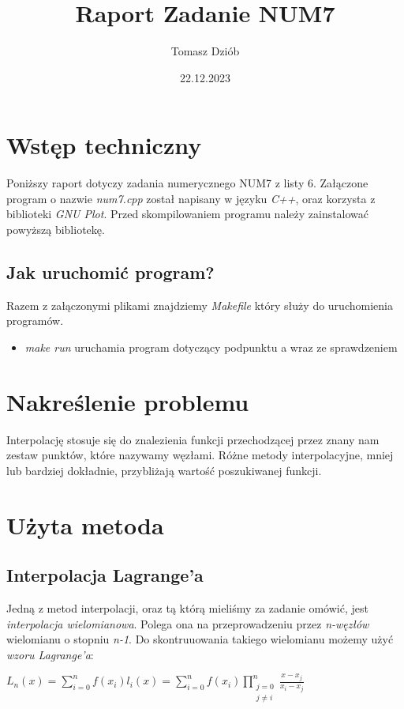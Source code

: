 \documentclass{article}
\title{Raport Zadanie NUM7}
\date{22.12.2023}
\author{Tomasz Dziób}
\begin{document}
  \maketitle
  \newpage
  \section{Wstęp techniczny}
  Poniższy raport dotyczy zadania numerycznego NUM7 z listy 6. Załączone program o nazwie \textit{num7.cpp} został napisany w języku \textit{C++}, oraz korzysta z biblioteki \textit{GNU Plot}. Przed skompilowaniem programu należy zainstalować powyższą bibliotekę.

    \subsection{Jak uruchomić program?}
    Razem z załączonymi plikami znajdziemy \textit{Makefile} który służy do uruchomienia programów.
    \begin{itemize}
      \item \textit{make run} uruchamia program dotyczący podpunktu a wraz ze sprawdzeniem 
  \end{itemize}

  \section{Nakreślenie problemu}
  Interpolację stosuje się do znalezienia funkcji przechodzącej przez znany nam zestaw punktów, które nazywamy węzłami. Różne metody interpolacyjne, mniej lub bardziej dokładnie, przybliżają wartość poszukiwanej funkcji.

  \section{Użyta metoda}
  \subsection{Interpolacja Lagrange'a}
  Jedną z metod interpolacji, oraz tą którą mieliśmy za zadanie omówić, jest \textit{interpolacja wielomianowa}. Polega ona na przeprowadzeniu przez \textit{n-węzłów} wielomianu o stopniu \textit{n-1}.
  Do skontruuowania takiego wielomianu możemy użyć \textit{wzoru Lagrange'a}:
  \begin{center}
    $L_{n}(x) = \sum\limits_{i=0}^{n}f(x_i)l_i(x) = \sum\limits_{i=0}^{n}f(x_i)\prod\limits_{\substack{j=0 \\ j \neq i}}^{n} \frac{x - x_j}{x_i - x_j}$
  \end{center}
\end{document}
